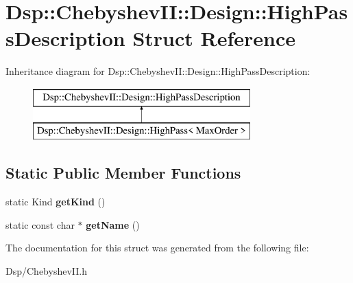 \hypertarget{structDsp_1_1ChebyshevII_1_1Design_1_1HighPassDescription}{\section{Dsp\-:\-:Chebyshev\-I\-I\-:\-:Design\-:\-:High\-Pass\-Description Struct Reference}
\label{structDsp_1_1ChebyshevII_1_1Design_1_1HighPassDescription}
}
Inheritance diagram for Dsp\-:\-:Chebyshev\-I\-I\-:\-:Design\-:\-:High\-Pass\-Description\-:\begin{figure}[H]
\begin{center}
\leavevmode
\includegraphics[height=2.000000cm]{structDsp_1_1ChebyshevII_1_1Design_1_1HighPassDescription}
\end{center}
\end{figure}
\subsection*{Static Public Member Functions}
\begin{DoxyCompactItemize}
\item 
\hypertarget{structDsp_1_1ChebyshevII_1_1Design_1_1HighPassDescription_a0bfac062474eb9afd0575ea4b4461411}{static Kind {\bfseries get\-Kind} ()}\label{structDsp_1_1ChebyshevII_1_1Design_1_1HighPassDescription_a0bfac062474eb9afd0575ea4b4461411}

\item 
\hypertarget{structDsp_1_1ChebyshevII_1_1Design_1_1HighPassDescription_a63a337b7db949435f8df7135730a2bb5}{static const char $\ast$ {\bfseries get\-Name} ()}\label{structDsp_1_1ChebyshevII_1_1Design_1_1HighPassDescription_a63a337b7db949435f8df7135730a2bb5}

\end{DoxyCompactItemize}


The documentation for this struct was generated from the following file\-:\begin{DoxyCompactItemize}
\item 
Dsp/Chebyshev\-I\-I.\-h\end{DoxyCompactItemize}
